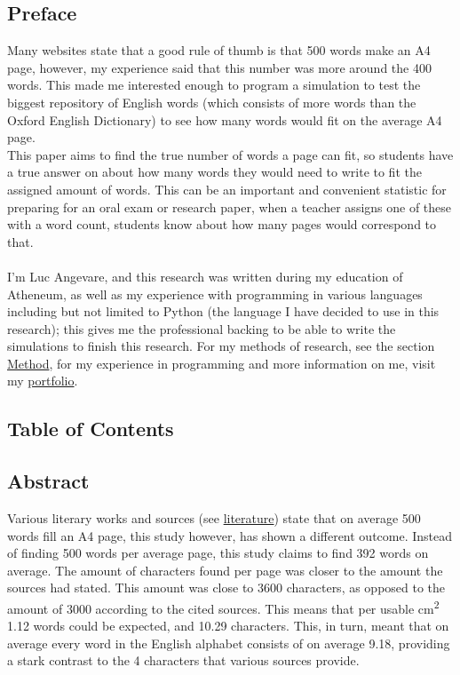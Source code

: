 \documentclass[9pt, a4paper]{article}
\begin{document}
\subsection{Preface}
\label{sec:preface}
Many websites state that a good rule of thumb is that 500 words make an A4 page, however, my experience said that this number was more around the 400 words. This made me interested enough to program a simulation to test the biggest repository of English words (which consists of more words than the Oxford English Dictionary) to see how many words would fit on the average A4 page.\\
This paper aims to find the true number of words a page can fit, so students have a true answer on about how many words they would need to write to fit the assigned amount of words. This can be an important and convenient statistic for preparing for an oral exam or research paper, when a teacher assigns one of these with a word count, students know about how many pages would correspond to that.\\
\\
I'm Luc Angevare, and this research was written during my education of Atheneum, as well as my experience with programming in various languages including but not limited to Python (the language I have decided to use in this research); this gives me the professional backing to be able to write the simulations to finish this research. For my methods of research, see the section \hyperref[sec:method]{Method}, for my experience in programming and more information on me, visit my \href{https://lucangevare.nl}{portfolio}.
\newpage

\subsection{Table of Contents}
\label{sec:contents}
\tableofcontents
\newpage

\subsection{Abstract}
\label{sec:abstract}
Various literary works and sources (see \hyperref[sec:literature]{literature}) state that on average 500 words fill an A4 page, this study however, has shown a different outcome. Instead of finding 500 words per average page, this study claims to find 392 words on average. The amount of characters found per page was closer to the amount the sources had stated. This amount was close to 3600 characters, as opposed to the amount of 3000 according to the cited sources. This means that per usable cm\textsuperscript{2} 1.12 words could be expected, and 10.29 characters. This, in turn, meant that on average every word in the English alphabet consists of on average 9.18, providing a stark contrast to the 4 characters that various sources provide.
\end{document}
